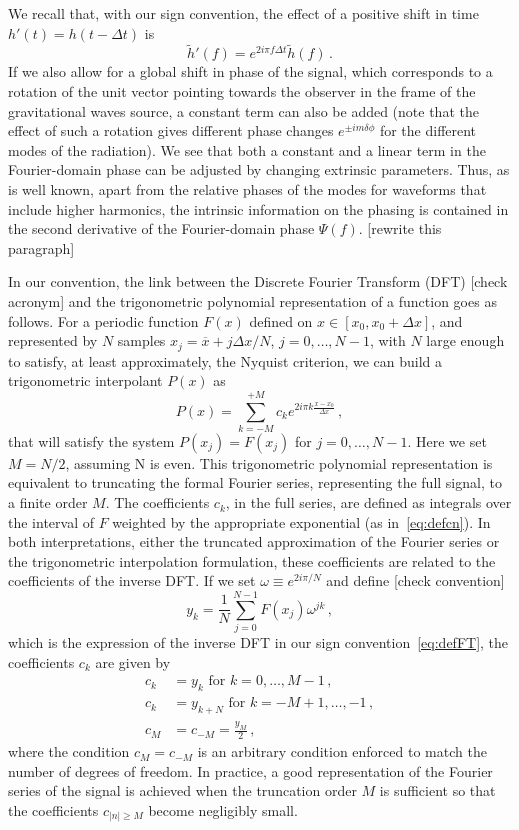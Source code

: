 \documentclass[aps,showpacs,twocolumn,
prd,superscriptaddress,nofootinbib]{revtex4-1}
\newcommand{\be}{\begin{equation}}
\newcommand{\ee}{\end{equation}}
\newcommand{\ov}[1]{\overline{#1}}
\newcommand{\nn}{\nonumber}
\newcommand{\SM}[1]{{\color{Red} #1}}
\begin{document}
We recall that, with our sign convention, the effect of a positive shift in time $h' (t) = h(t- \Delta t)$ is
\be
	\tilde{h}'(f) = e^{2i\pi f \Delta t} \tilde{h}(f) \,.
\ee
If we also allow for a global shift in phase of the signal, which corresponds to a rotation of the unit vector pointing towards the observer in the frame of the gravitational waves source, a constant term can also be added (note that the effect of such a rotation gives different phase changes $e^{\pm i m \delta \phi}$ for the different modes of the radiation). We see that both a constant and a linear term in the Fourier-domain phase can be adjusted by changing extrinsic parameters. Thus, as is well known, apart from the relative phases of the modes for waveforms that include higher harmonics, the intrinsic information on the phasing is contained in the second derivative of the Fourier-domain phase $\Psi(f)$. \SM{[rewrite this paragraph]}

In our convention, the link between the Discrete Fourier Transform (DFT) \SM{[check acronym]} and the trigonometric polynomial representation of a function goes as follows. For a periodic function $F(x)$ defined on $x\in [x_{0}, x_{0} + \Delta x]$, and represented by $N$ samples $x_{j} = \ov{x} + j \Delta x/N$, $j=0,\dots,N-1$, with $N$ large enough to satisfy, at least approximately, the Nyquist criterion, we can build a trigonometric interpolant $P(x)$ as
\be
	P(x) = \sum\limits_{k=-M}^{+M} c_{k} e^{2i\pi k \frac{x-x_{0}}{\Delta x}} \,,
\ee
that will satisfy the system $P(x_{j}) = F(x_{j})$ for $j=0,\dots, N-1$. Here we set $M=N/2$, assuming N is even. This trigonometric polynomial representation is equivalent to truncating the formal Fourier series, representing the full signal, to a finite order $M$. The coefficients $c_{k}$, in the full series, are defined as integrals over the interval of $F$ weighted by the appropriate exponential (as in~\eqref{eq:defcn}). In both interpretations, either the truncated approximation of the Fourier series or  the trigonometric interpolation formulation, these coefficients are related to the coefficients of the inverse DFT. If we set $\omega \equiv e^{2i\pi/N}$ and define \SM{[check convention]}
\be\label{eq:ykDFT}
	y_{k} = \frac{1}{N} \sum\limits_{j=0}^{N-1} F(x_{j}) \omega^{jk} \,,
\ee
which is the expression of the inverse DFT in our sign convention~\eqref{eq:defFT}, the coefficients $c_{k}$ are given by
\begin{align}\label{eq:ckyk}
	c_{k} &= y_{k} \text{ for } k=0,\dots, M-1 \,, \nn\\
	c_{k} &= y_{k+N} \text{ for } k=-M+1,\dots, -1 \,, \nn\\
	c_{M} &= c_{-M} = \frac{y_{M}}{2} \,,
\end{align}
where the condition $c_{M} = c_{-M}$ is an arbitrary condition enforced to match the number of degrees of freedom. In practice, a good representation of the Fourier series of the signal is achieved when the truncation order $M$ is sufficient so that the coefficients $c_{|n|\geq M}$ become negligibly small.
\end{document}
